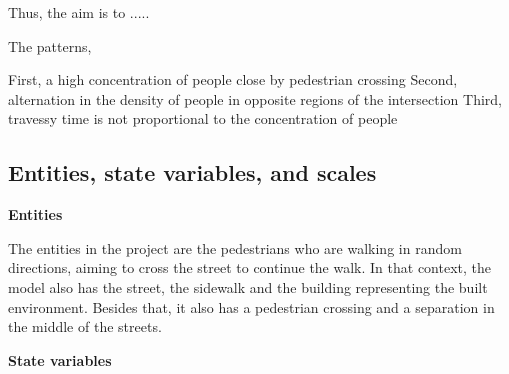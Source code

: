 \documentclass[10pt]{report}
\numberwithin{figure}{section}
\numberwithin{table}{section}
\begin{document}
Thus, the aim is to .....

The patterns, 

First, a high concentration of people close by pedestrian crossing
Second, alternation in the density of people in opposite regions of the intersection
Third, travessy time is not proportional to the concentration of people

\subsection{Entities, state variables, and scales}

\textbf{Entities}

The entities in the project are the pedestrians who are walking in random directions, aiming to cross the street to continue the walk. In that context, the model also has the street, the sidewalk and the building representing the built environment. Besides that, it also has a pedestrian crossing and a separation in the middle of the streets.


\textbf{State variables}
\end{document}
